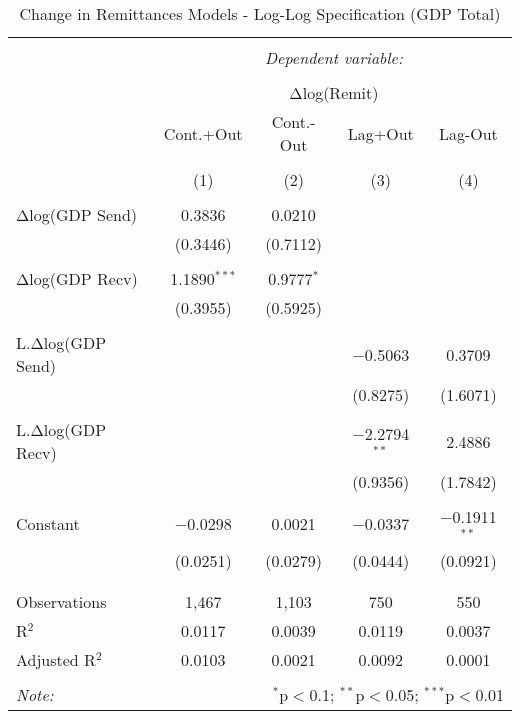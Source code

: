 
\begin{table}[!htbp] \centering 
  \caption{Change in Remittances Models - Log-Log Specification (GDP Total)} 
  \label{} 
\begin{tabular}{@{\extracolsep{5pt}}lcccc} 
\\[-1.8ex]\hline 
\hline \\[-1.8ex] 
 & \multicolumn{4}{c}{\textit{Dependent variable:}} \\ 
\cline{2-5} 
\\[-1.8ex] & \multicolumn{4}{c}{Δlog(Remit)} \\ 
 & Cont.+Out & Cont.-Out & Lag+Out & Lag-Out \\ 
\\[-1.8ex] & (1) & (2) & (3) & (4)\\ 
\hline \\[-1.8ex] 
 Δlog(GDP Send) & 0.3836 & 0.0210 &  &  \\ 
  & (0.3446) & (0.7112) &  &  \\ 
  & & & & \\ 
 Δlog(GDP Recv) & 1.1890$^{***}$ & 0.9777$^{*}$ &  &  \\ 
  & (0.3955) & (0.5925) &  &  \\ 
  & & & & \\ 
 L.Δlog(GDP Send) &  &  & $-$0.5063 & 0.3709 \\ 
  &  &  & (0.8275) & (1.6071) \\ 
  & & & & \\ 
 L.Δlog(GDP Recv) &  &  & $-$2.2794$^{**}$ & 2.4886 \\ 
  &  &  & (0.9356) & (1.7842) \\ 
  & & & & \\ 
 Constant & $-$0.0298 & 0.0021 & $-$0.0337 & $-$0.1911$^{**}$ \\ 
  & (0.0251) & (0.0279) & (0.0444) & (0.0921) \\ 
  & & & & \\ 
\hline \\[-1.8ex] 
Observations & 1,467 & 1,103 & 750 & 550 \\ 
R$^{2}$ & 0.0117 & 0.0039 & 0.0119 & 0.0037 \\ 
Adjusted R$^{2}$ & 0.0103 & 0.0021 & 0.0092 & 0.0001 \\ 
\hline 
\hline \\[-1.8ex] 
\textit{Note:}  & \multicolumn{4}{r}{$^{*}$p$<$0.1; $^{**}$p$<$0.05; $^{***}$p$<$0.01} \\ 
\end{tabular} 
\end{table} 
